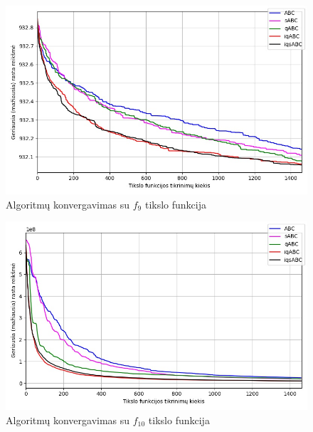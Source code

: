 \documentclass{VUMIFPSmagistrinis}
\begin{document}
\begin{landscape}
\begin{multicols}{2}
\begin{figure}[H]
    \centering
    \includegraphics[scale=0.45]{img/2kv/all_f9.jpg}
    \caption{Algoritmų konvergavimas su $f_{9}$ tikslo funkcija}
    \label{img:konf9}
\end{figure}



\begin{figure}[H]
    \centering
    \includegraphics[scale=0.45]{img/2kv/all_f10.jpg}
    \caption{Algoritmų konvergavimas su $f_{10}$ tikslo funkcija}
    \label{img:konf10}
\end{figure}



\end{multicols}\newpage
\begin{multicols}{2}


\end{multicols}
\end{landscape}
\end{document}
